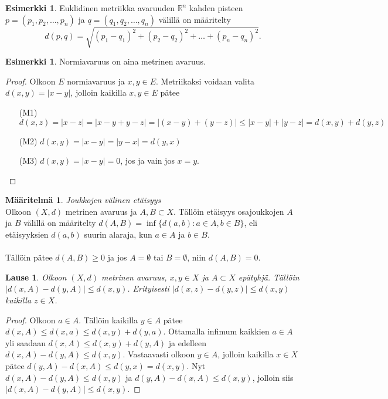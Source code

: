 \documentclass[12pt,a4paper,leqno]{report}
\newcommand{\R}{\mathbb{R}}
\theoremstyle{plain}
\newtheorem{lause}[equation]{Lause}
\theoremstyle{definition}
\newtheorem{maar}[equation]{Määritelmä}
\newtheorem{esim}[equation]{Esimerkki}
\theoremstyle{remark}
\begin{document}
\begin{esim}
Euklidinen metriikka avaruuden $\R^n$ kahden pisteen $p=(p_1,p_2,\dots,p_n)$ ja $q=(q_1,q_2,\dots,q_n)$ välillä on määritelty 
$$d(p,q)=\sqrt{(p_1-q_1)^2+(p_2-q_2)^2+\dots+(p_n-q_n)^2}.$$
\end{esim}

\begin{esim}
Normiavaruus on aina metrinen avaruus. 

\begin{proof}
Olkoon $E$ normiavaruus ja $x,y\in E$. 
Metriikaksi voidaan valita $d(x,y)=|x-y|$, jolloin kaikilla $x,y\in E$ pätee
\begin{itemize}
\item[(M1)]%
$d(x,z)=|x-z|=|x-y+y-z|=|(x-y)+(y-z)|\leq|x-y|+|y-z|=d(x,y)+d(y,z)$
\item[(M2)]$d(x,y)=|x-y|=|y-x|=d(y,x)$
\item[(M3)]$d(x,y)=|x-y|=0$, jos ja vain jos $x=y$.
\end{itemize}
\end{proof}

\end{esim}
\begin{maar}\emph{Joukkojen välinen etäisyys}\\
Olkoon $(X,d)$ metrinen avaruus ja $A,B\subset X$. Tällöin etäisyys osajoukkojen $A$ ja $B$ välillä on määritelty $d(A,B)=\inf\{d(a,b)\colon a\in A, b\in B\}$, eli etäisyyksien $d(a,b)$ suurin alaraja, kun $a\in A$ ja $b\in B$. \\
\\
Tällöin pätee $d(A,B)\geq 0$ ja jos $A= \emptyset$ tai $B= \emptyset$, niin $d(A,B)= 0$. 

\end{maar}
\begin{lause}
Olkoon $(X,d)$ metrinen avaruus, $x,y\in X$ ja $A\subset X$ epätyhjä. Tällöin $|d(x,A)-d(y,A)|\leq d(x,y)$. Erityisesti $|d(x,z)-d(y,z)|\leq d(x,y)$ kaikilla $z\in X$.
\end{lause}

\begin{proof}
Olkoon $a\in A$. Tällöin kaikilla $y\in A$ pätee $d(x,A)\leq d(x,a)\leq d(x,y)+d(y,a)$. Ottamalla infimum kaikkien $a\in A$ yli saadaan $d(x,A)\leq d(x,y)+d(y,A)$
ja edelleen $d(x,A)-d(y,A)\leq d(x,y) $.
Vastaavasti olkoon $y\in A$, jolloin kaikilla $x\in X$ pätee $d(y,A)-d(x,A)\leq d(y,x)=d(x,y) $. Nyt $d(x,A)-d(y,A)\leq d(x,y) $ ja $d(y,A)-d(x,A)\leq d(x,y) $, jolloin siis $|d(x,A)-d(y,A)|\leq d(x,y) $.

\end{proof}
\end{document}
